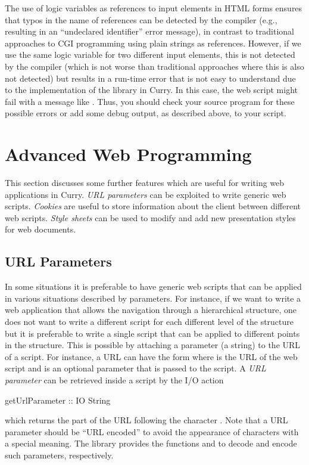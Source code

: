 The use of logic variables as references to input elements
in HTML forms ensures that typos in the name of references
can be detected by the compiler (e.g., resulting in an
``undeclared identifier'' error message), in contrast
to traditional approaches to CGI programming using plain strings
as references.
However, if we use the same logic variable for two different
input elements, this is not detected by the compiler
(which is not worse than traditional approaches where this
is also not detected) but results in a run-time error
that is not easy to understand due to the implementation
of the library  in Curry.
In this case, the web script might fail with a message like
.
Thus, you should check your source program for these possible errors
or add some debug output, as described above, to your script.


\section{Advanced Web Programming}
\label{sec-advanced-web-programming}

This section discusses some further features which are useful
for writing web applications in Curry.
\emph{URL parameters} can be exploited to write generic web scripts.
\emph{Cookies} are useful to store information about the client
between different web scripts.
\emph{Style sheets} can be used to modify and add new presentation styles
for web documents.


\subsection{URL Parameters}

In some situations it is preferable to have generic web scripts that
can be applied in various situations described by parameters.
For instance, if we want to write a web application that
allows the navigation through a hierarchical structure,
one does not want to write a different script for each different
level of the structure but it is preferable to write a single
script that can be applied to different points in the structure.
This is possible by attaching a parameter (a string)
to the URL of a script. For instance, a URL can have the form
 where
 is the URL of the web script
and  is an optional parameter that is passed
to the script.
A \emph{URL parameter}
can be retrieved inside a script
by the I/O action
%
\begin{curry}
getUrlParameter :: IO String
\end{curry}
%
which returns the part of the URL following the character .
Note that a URL parameter should be ``URL encoded'' to avoid
the appearance of characters with a special meaning.
The library  provides the functions
 and 
to decode and encode such parameters, respectively.

